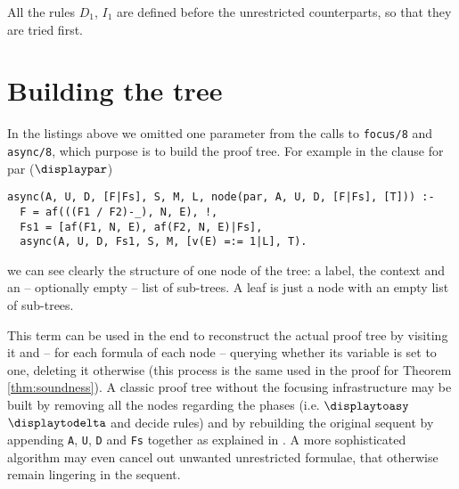All the rules $D_1$, $I_1$ are defined before the unrestricted counterparts, so that they are tried first.

\section{Building the tree}
In the listings above we omitted one parameter from the calls to \texttt{focus/8} and \texttt{async/8}, which purpose is to build the proof tree.
For example in the clause for par ($\displaypar$)
\begin{verbatim}
async(A, U, D, [F|Fs], S, M, L, node(par, A, U, D, [F|Fs], [T])) :- 
  F = af(((F1 / F2)-_), N, E), !,
  Fs1 = [af(F1, N, E), af(F2, N, E)|Fs],
  async(A, U, D, Fs1, S, M, [v(E) =:= 1|L], T).
\end{verbatim}
we can see clearly the structure of one node of the tree: a label, the context and an -- optionally empty -- list of sub-trees.
A leaf is just a node with an empty list of sub-trees.

This term can be used in the end to reconstruct the actual proof tree by visiting it and -- for each formula of each node -- querying whether its variable is set to one, deleting it otherwise (this process is the same used in the proof for Theorem \ref{thm:soundness}).
A classic proof tree without the focusing infrastructure may be built by removing all the nodes regarding the phases (i.e. $\displaytoasy$ $\displaytodelta$ and decide rules) and by rebuilding the original sequent by appending \texttt{A}, \texttt{U}, \texttt{D} and \texttt{Fs} together as explained in \cite{Focusing}. 
A more sophisticated algorithm may even cancel out unwanted unrestricted formulae, that otherwise remain lingering in the sequent.

